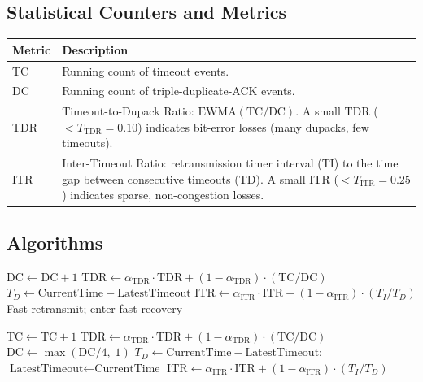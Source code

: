 \documentclass[12pt,a4paper]{article}
\begin{document}
\subsection{Statistical Counters and Metrics}

\begin{table}[H]
\centering
\renewcommand{\arraystretch}{1.3}
\begin{tabularx}{0.92\textwidth}{@{}lX@{}}
\toprule
\textbf{Metric} & \textbf{Description} \\
\midrule
TC  & Running count of timeout events. \\
DC  & Running count of triple-duplicate-ACK events. \\
TDR & Timeout-to-Dupack Ratio: $\text{EWMA}(\text{TC}/\text{DC})$.
      A small TDR ($< T_\text{TDR} = 0.10$) indicates bit-error
      losses (many dupacks, few timeouts). \\
ITR & Inter-Timeout Ratio: retransmission timer interval (TI) to the time gap between consecutive timeouts (TD). A small ITR ($< T_\text{ITR} = 0.25$)
      indicates sparse, non-congestion losses. \\
\bottomrule
\end{tabularx}
\end{table}

\subsection{Algorithms}

\begin{algorithm}[H]
\caption{DupACK Action (NewReno+) — called on every 3-dupack event}
\begin{algorithmic}[1]
\State $\text{DC} \gets \text{DC} + 1$
\State $\text{TDR} \gets \alpha_\text{TDR}\cdot\text{TDR}
       + (1-\alpha_\text{TDR})\cdot(\text{TC}/\text{DC})$
\State $T_D \gets \text{CurrentTime} - \text{LatestTimeout}$
\State $\text{ITR} \gets \alpha_\text{ITR}\cdot\text{ITR}
       + (1-\alpha_\text{ITR})\cdot(T_I/T_D)$
\State Fast-retransmit; enter fast-recovery
\State {}
\end{algorithmic}
\end{algorithm}

\begin{algorithm}[H]
\caption{Timeout Action (NewReno+) — called on every RTO expiry}
\begin{algorithmic}[1]
\State $\text{TC} \gets \text{TC} + 1$
\State $\text{TDR} \gets \alpha_\text{TDR}\cdot\text{TDR}
       + (1-\alpha_\text{TDR})\cdot(\text{TC}/\text{DC})$
\State $\text{DC} \gets \max(\text{DC}/4,\;1)$
\State $T_D \gets \text{CurrentTime} - \text{LatestTimeout}$;
       \quad $\text{LatestTimeout} \gets \text{CurrentTime}$
\State $\text{ITR} \gets \alpha_\text{ITR}\cdot\text{ITR}
       + (1-\alpha_\text{ITR})\cdot(T_I/T_D)$
\State {}
\end{algorithmic}
\end{algorithm}
\end{document}
